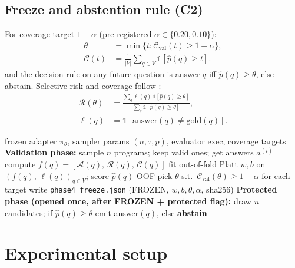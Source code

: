 \documentclass[conference]{IEEEtran}
\newcommand{\ourmethod}{EVG-CAS}
\newcommand{\RR}{\mathcal{R}}
\newcommand{\CC}{\mathcal{C}}
\newcommand{\p}{\hat p}
\begin{document}
\subsection{Freeze and abstention rule (C2)}
For coverage target $1-\alpha$ (pre-registered $\alpha \in \{0.20, 0.10\}$):
\begin{equation}
\begin{aligned}
  \theta &= \min\{t : \CC_{\text{val}}(t) \ge 1-\alpha\},\\
  \CC(t) &= \frac{1}{|V|}\sum_{q\in V}\mathbb{1}[\p(q)\ge t].
\end{aligned}
\end{equation}
and the decision rule on any future question is answer $q$ iff $\p(q) \ge \theta$, else abstain.
Selective risk and coverage follow \citep{eliyaniv2010selective}:
\begin{equation}
\begin{aligned}
  \RR(\theta)&=\frac{\sum_q \ell(q)\,\mathbb{1}[\p(q)\ge\theta]}
                    {\sum_q\mathbb{1}[\p(q)\ge\theta]},\\
  \ell(q)&=\mathbb{1}[\text{answer}(q)\neq \text{gold}(q)].
\end{aligned}
\end{equation}

\begin{algorithm}[t]
\caption{\ourmethod{} decision pipeline (fit once on validation; frozen thereafter)}
\begin{algorithmic}[1]
\Require frozen adapter $\pi_\theta$, sampler params $(n,\tau,p)$, evaluator $\text{exec}$, coverage targets
\State \textbf{Validation phase:}
  \State sample $n$ programs; keep valid ones; get answers $a^{(i)}$
  \State compute $f(q)=[\mathcal{A}(q),\,\mathcal{R}(q),\,\mathcal{C}(q)]$
\EndFor
\State fit out-of-fold Platt $w,b$ on $(f(q),\,\ell(q))_{q\in V}$; score $\p(q)$ OOF
\State pick $\theta$ s.t.\ $\CC_{\text{val}}(\theta) \ge 1-\alpha$ for each target
\State write \texttt{phase4\_freeze.json} (FROZEN, $w,b,\theta,\alpha$, sha256)
\State \textbf{Protected phase (opened once, after FROZEN + protected flag):}
  \State draw $n$ candidates; if $\p(q) \ge \theta$ emit answer$(q)$, else \textbf{abstain}
\EndFor
\end{algorithmic}
\end{algorithm}

\section{Experimental setup}\label{sec:setup}
\end{document}
